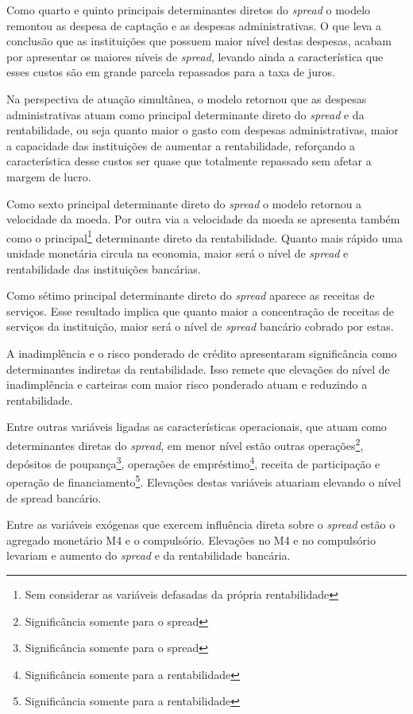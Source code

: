 \documentclass[
  12pt,
  12pt,
  openright,
  oneside,
  a4paper,
  chapter=TITLE,
  section=TITLE,
  subsection=TITLE,
  subsubsection=TITLE,
  portugues,
  sumario=tradicional]{abntex2}
\begin{document}
Como quarto e quinto principais determinantes diretos do \emph{spread} o modelo remontou as despesa de captação e as despesas administrativas. O que leva a conclusão que as instituições que possuem maior nível destas despesas, acabam por apresentar os maiores níveis de \emph{spread}, levando ainda a característica que esses custos são em grande parcela repassados para a taxa de juros.

Na perspectiva de atuação simultânea, o modelo retornou que as despesas administrativas atuam como principal determinante direto do \emph{spread} e da rentabilidade, ou seja quanto maior o gasto com despesas administrativas, maior a capacidade das instituições de aumentar a rentabilidade, reforçando a característica desse custos ser quase que totalmente repassado sem afetar a margem de lucro.

Como sexto principal determinante direto do \emph{spread} o modelo retornou a velocidade da moeda. Por outra via a velocidade da moeda se apresenta também como o principal\footnote{Sem considerar as variáveis defasadas da própria rentabilidade} determinante direto da rentabilidade. Quanto mais rápido uma unidade monetária circula na economia, maior será o nível de \emph{spread} e rentabilidade das instituições bancárias.

Como sétimo principal determinante direto do \emph{spread} aparece as receitas de serviços. Esse resultado implica que quanto maior a concentração de receitas de serviços da instituição, maior será o nível de \emph{spread} bancário cobrado por estas.

A inadimplência e o risco ponderado de crédito apresentaram significância como determinantes indiretas da rentabilidade. Isso remete que elevações do nível de inadimplência e carteiras com maior risco ponderado atuam e reduzindo a rentabilidade.

Entre outras variáveis ligadas as características operacionais, que atuam como determinantes diretas do \emph{spread}, em menor nível estão outras operações\footnote{Significância somente para o spread}, depósitos de poupança\footnote{Significância somente para o spread}, operações de empréstimo\footnote{Significância somente para a rentabilidade}, receita de participação e operação de financiamento\footnote{Significância somente para a rentabilidade}. Elevações destas variáveis atuariam elevando o nível de spread bancário.

Entre as variáveis exógenas que exercem influência direta sobre o \emph{spread} estão o agregado monetário M4 e o compulsório. Elevações no M4 e no compulsório levariam e aumento do \emph{spread} e da rentabilidade bancária.
\end{document}
